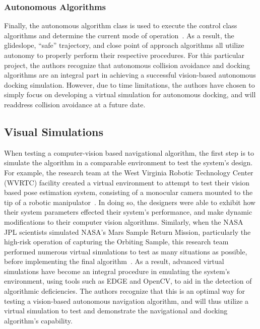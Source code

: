 \documentclass[journal, 10pt]{IEEEtran}
\begin{document}
\subsubsection{Autonomous Algorithms}
Finally, the autonomous algorithm class is used to execute the control class algorithms and determine the current mode of operation~\cite{SPHERES_form}. As a result, the glideslope, ``safe'' trajectory, and close point of approach algorithms all utilize autonomy to properly perform their respective procedures. For this particular project, the authors recognize that autonomous collision avoidance and docking algorithms are an integral part in achieving a successful vision-based autonomous docking simulation. However, due to time limitations, the authors have chosen to simply focus on developing a virtual simulation for autonomous docking, and will readdress collision avoidance at a future date.

\subsection{Visual Simulations}

When testing a computer-vision based navigational algorithm, the first step is to simulate the algorithm in a comparable environment to test the system's design. For example, the research team at the West Virginia Robotic Technology Center (WVRTC) facility created a virtual environment to attempt to test their vision based pose estimation system, consisting of a monocular camera mounted to the tip of a robotic manipulator~\cite{virt_sim}. In doing so, the designers were able to exhibit how their system parameters effected their system's performance, and make dynamic modifications to their computer vision algorithms. Similarly, when the NASA JPL scientists simulated NASA's Mars Sample Return Mission, particularly the high-risk operation of capturing the Orbiting Sample, this research team performed numerous virtual simulations to test as many situations as possible, before implementing the final algorithm~\cite{mars}. As a result, advanced virtual simulations have become an integral procedure in emulating the system's environment, using tools such as EDGE and OpenCV, to aid in the detection of algorithmic deficiencies. The authors recognize that this is an optimal way for testing a vision-based autonomous navigation algorithm, and will thus utilize a virtual simulation to test and demonstrate the navigational and docking algorithm's capability.
\end{document}
